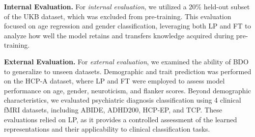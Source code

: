 \begin{table}[t!]
\caption{Dataset Subject Demographics}
\vspace{-2mm}
\label{table:participant_demographics}
\scriptsize
\centering
{} %
\vspace{-2mm}
\end{table}


\textbf{Internal Evaluation.} For \textit{internal evaluation}, we utilized a 20\% held-out subset of the UKB dataset, which was excluded from pre-training. This evaluation focused on age regression and gender classification, leveraging both LP and FT to analyze how well the model retains and transfers knowledge acquired during pre-training.

\textbf{External Evaluation.} For \textit{external evaluation}, we examined the ability of BDO to generalize to unseen datasets. Demographic and trait prediction was performed on the HCP-A dataset, where LP and FT were employed to assess model performance on age, gender, neuroticism, and flanker scores. Beyond demographic characteristics, we evaluated psychiatric diagnosis classification using 4 clinical fMRI datasets, including ABIDE, ADHD200, HCP-EP, and TCP. These evaluations relied on LP, as it provides a controlled assessment of the learned representations and their applicability to clinical classification tasks.


